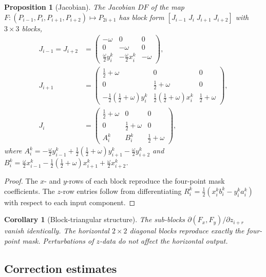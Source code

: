 \documentclass{article}
\theoremstyle{plain}
\newtheorem{proposition}[theorem]{Proposition}
\newtheorem{corollary}[theorem]{Corollary}
\theoremstyle{definition}
\begin{document}
\begin{proposition}[Jacobian]\label{prop:jacobian}
The Jacobian $DF$ of the map $F:(P_{i-1},P_i,P_{i+1},P_{i+2})\mapsto
P_{2i+1}$ has block form $[J_{i-1}\;J_i\;J_{i+1}\;J_{i+2}]$ with
$3\times 3$ blocks,
\begin{align*}
J_{i-1}=J_{i+2}&=
\begin{pmatrix}-\omega&0&0\\0&-\omega&0\\
\tfrac{\omega}{2}y_i^k&-\tfrac{\omega}{2}x_i^k&-\omega\end{pmatrix},\\[4pt]
J_{i+1}&=
\begin{pmatrix}\tfrac{1}{2}{+}\omega&0&0\\0&\tfrac{1}{2}{+}\omega&0\\
-\tfrac{1}{2}(\tfrac{1}{2}{+}\omega)y_i^k
  &\tfrac{1}{2}(\tfrac{1}{2}{+}\omega)x_i^k&\tfrac{1}{2}{+}\omega\end{pmatrix},\\[4pt]
J_i&=
\begin{pmatrix}\tfrac{1}{2}{+}\omega&0&0\\0&\tfrac{1}{2}{+}\omega&0\\
A_i^k&B_i^k&\tfrac{1}{2}{+}\omega\end{pmatrix},
\end{align*}
where $A_i^k=-\tfrac{\omega}{2}y_{i-1}^k+\tfrac{1}{2}(\tfrac{1}{2}+\omega)y_{i+1}^k
-\tfrac{\omega}{2}y_{i+2}^k$ and
$B_i^k=\tfrac{\omega}{2}x_{i-1}^k-\tfrac{1}{2}(\tfrac{1}{2}+\omega)x_{i+1}^k
+\tfrac{\omega}{2}x_{i+2}^k$.
\end{proposition}

\begin{proof}
The $x$- and $y$-rows of each block reproduce the four-point mask coefficients.
The $z$-row entries follow from differentiating $R_i^k=\tfrac{1}{2}(x_i^k b_i^k
-y_i^k a_i^k)$ with respect to each input component.
\end{proof}

\begin{corollary}[Block-triangular structure]\label{cor:triangular}
The sub-blocks $\partial(F_x,F_y)/\partial z_{i+r}$ vanish identically. The
horizontal $2\times 2$ diagonal blocks reproduce exactly the four-point mask.
Perturbations of $z$-data do not affect the horizontal output.
\end{corollary}

\subsection{Correction estimates}
\end{document}
